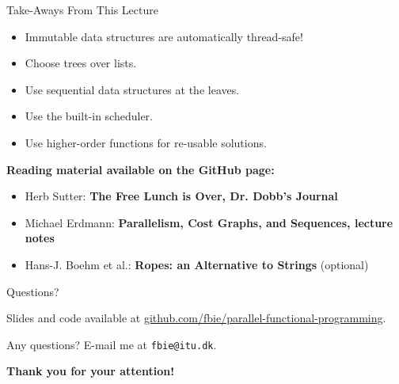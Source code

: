 \documentclass{beamer}
\begin{document}
\begin{frame}{Take-Aways From This Lecture}
  \begin{itemize}
  \pause{} \item Immutable data structures are automatically thread-safe!
  \pause{} \item Choose trees over lists.
  \pause{} \item Use sequential data structures at the leaves.
  \pause{} \item Use the built-in scheduler.
  \pause{} \item Use higher-order functions for re-usable solutions.
  \end{itemize}

  \pause{} \vspace{0.5cm}

  \textbf{Reading material available on the GitHub page:}

  \begin{itemize}
  \pause{} \item Herb Sutter: \textbf{The Free Lunch is Over, Dr. Dobb's Journal}
  \pause{} \item Michael Erdmann: \textbf{Parallelism, Cost Graphs, and Sequences, lecture notes}
  \pause{} \item Hans-J. Boehm et al.: \textbf{Ropes: an Alternative to Strings} (optional)
  \end{itemize}
\end{frame}

\begin{frame}{Questions?}
  \begin{center}
    Slides and code available at \url{github.com/fbie/parallel-functional-programming}.
  \end{center}

  \pause{}

  \begin{center}
    Any questions? E-mail me at \texttt{fbie@itu.dk}.
  \end{center}

  \pause{}

  \begin{center}
    \textbf{Thank you for your attention!}
  \end{center}
\end{frame}
\end{document}
